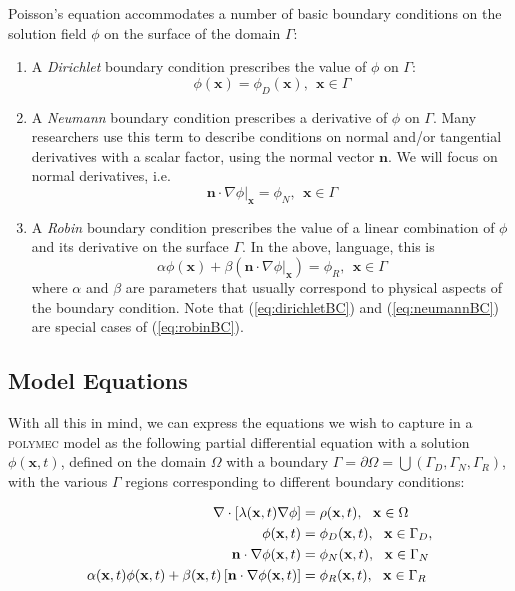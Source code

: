 \documentclass[12pt]{article}
\newcommand{\labelEq}[1]{\label{eq:#1}}
\newcommand{\refEq}[1]{(\ref{eq:#1})}
\newcommand{\polymec}{\textsc{polymec} }
\renewcommand{\vec}[1]{\mathbf{#1}}
\newcommand{\diverg}[1]{\nabla\cdot#1}
\newcommand{\grad}[1]{\nabla#1}
\begin{document}
Poisson's equation accommodates a number of basic boundary conditions on the 
solution field $\phi$ on the surface of the domain $\Gamma$:

\begin{enumerate}
 \item A {\em Dirichlet} boundary condition prescribes the value of $\phi$ on $\Gamma$:
 \begin{equation}
 \phi(\vec{x}) = \phi_D(\vec{x}), ~~\vec{x} \in \Gamma \labelEq{dirichletBC}
 \end{equation}
 \item A {\em Neumann} boundary condition prescribes a derivative of $\phi$ on $\Gamma$.
       Many researchers use this term to describe conditions on normal and/or tangential 
       derivatives with a scalar factor, using the normal vector $\vec{n}$. We will focus on normal derivatives, i.e.
 \begin{equation}
 \vec{n}\cdot\grad{\phi}\big|_\vec{x} = \phi_N, ~~\vec{x} \in \Gamma \labelEq{neumannBC}
 \end{equation}
 \item A {\em Robin} boundary condition prescribes the value of a linear combination of $\phi$ 
       and its derivative on the surface $\Gamma$. In the above, language, this is
 \begin{equation}
 \alpha\phi(\vec{x}) + \beta\left(\vec{n}\cdot\grad{\phi}\big|_\vec{x}\right) = \phi_R, ~~\vec{x} \in \Gamma \labelEq{robinBC}
 \end{equation}
 \noindent
 where $\alpha$ and $\beta$ are parameters that usually correspond to physical aspects of the 
 boundary condition. Note that \refEq{dirichletBC} and \refEq{neumannBC} are special cases of 
 \refEq{robinBC}.
\end{enumerate}

\subsection*{Model Equations}

With all this in mind, we can express the equations we wish to capture in a \polymec model 
as the following partial differential equation with a solution $\phi(\vec{x}, t)$, 
defined on the domain $\Omega$ with a boundary $\Gamma = \partial\Omega = \bigcup(\Gamma_D, \Gamma_N, \Gamma_R)$, 
with the various $\Gamma$ regions corresponding to different boundary conditions:

\begin{align}
\diverg\left[\lambda(\vec{x}, t)\grad{\phi}\right] &= \rho(\vec{x}, t), ~~\vec{x} \in \Omega \labelEq{modelEq} \\
\phi(\vec{x}, t) &= \phi_D(\vec{x}, t), ~~\vec{x} \in \Gamma_D, \notag \\
\vec{n}\cdot\grad{\phi(\vec{x}, t)} &= \phi_N(\vec{x}, t), ~~\vec{x} \in \Gamma_N \notag \\
\alpha(\vec{x}, t)\phi(\vec{x}, t) + \beta(\vec{x}, t)\left[\vec{n}\cdot\grad{\phi(\vec{x}, t)}\right] &= \phi_R(\vec{x}, t), ~~\vec{x} \in \Gamma_R \notag
\end{align}
\end{document}
